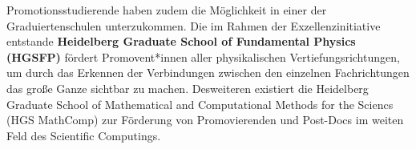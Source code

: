 Promotionsstudierende haben zudem die Möglichkeit in einer der Graduiertenschulen unterzukommen. 
Die im Rahmen der Exzellenzinitiative entstande \textbf{Heidelberg Graduate School of Fundamental Physics (HGSFP)} fördert Promovent*innen aller physikalischen Vertiefungsrichtungen, um durch das Erkennen der Verbindungen zwischen den einzelnen Fachrichtungen das große Ganze sichtbar zu machen.
Desweiteren existiert die Heidelberg Graduate School of Mathematical and Computational Methods for the Sciencs (HGS MathComp) zur Förderung von Promovierenden und Post-Docs im weiten Feld des Scientific Computings.\\

%
%